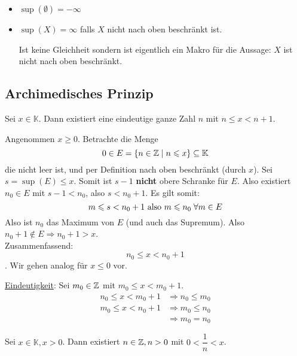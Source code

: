 \documentclass[main.tex]{subfiles}
\begin{document}
\begin{Definition}
  \begin{itemize}
    \item $\sup(\emptyset) = -\infty$
    \item $\sup(X) = \infty$ falls $X$ nicht nach oben beschränkt ist.
    \begin{Bemerkung}
      Ist keine Gleichheit sondern ist eigentlich ein Makro für die Aussage: $X$ ist nicht nach oben beschränkt.
    \end{Bemerkung}
  \end{itemize}
\end{Definition}

\subsection{Archimedisches Prinzip}

\begin{Theorem}
  Sei $x\in \mathbb{K}$. Dann existiert eine eindeutige ganze Zahl $n$ mit $n \leq x < n+1$.
\end{Theorem}

\begin{Beweis}
  Angenommen $x \geq 0$. Betrachte die Menge
  $$0 \in E = \{n \in \mathbb{Z} \mid n \leqslant x\}\subseteq \mathbb{K}$$
  die nicht leer ist, und per Definition nach oben beschränkt (durch $x$). Sei $s=\sup(E) \leq x$. Somit ist $s-1$ \textbf{nicht} obere Schranke für $E$. Also existiert $n_0 \in E$ mit $s-1 < n_0$, also $s < n_0+1$. Es gilt somit:
  $$ m \leqslant s < n_0 + 1 \text{ also } m \leqslant n_0 \;\forall m \in E$$
  Also ist $n_0$ das Maximum von $E$ (und auch das Supremum). Also $n_0 + 1 \notin E \Rightarrow n_0+1 > x$.\\
  Zusammenfassend: $$n_0 \leq x < n_0+1$$.
  Wir gehen analog für $x \leq 0$ vor.

  \underline{Eindeutigkeit}: Sei $m_0 \in \mathbb{Z}$ mit $m_0 \leq x < m_0+1$.
  $$\begin{aligned}
    n_0 \leq x < m_0+1 &\Rightarrow n_0 \leq m_0\\
    m_0 \leq x < n_0+1 &\Rightarrow m_0 \leq n_0\\
    & \Rightarrow m_0 = n_0
  \end{aligned}$$
\end{Beweis}

\begin{Korollar}
  Sei $x \in \mathbb{K}, x> 0$. Dann existiert $n\in \mathbb{Z}, n > 0$ mit $0 < \dfrac{1}{n} < x$.
\end{Korollar}
\end{document}

